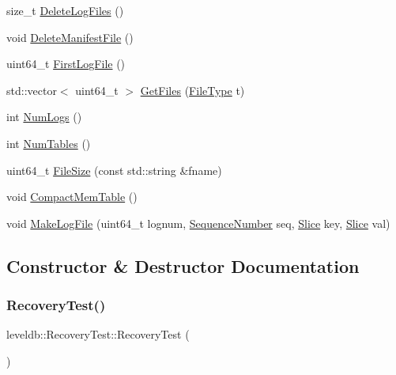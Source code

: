 \begin{DoxyCompactItemize}
\item 
size\+\_\+t \mbox{\hyperlink{classleveldb_1_1_recovery_test_a4c1f0cadf52c5580bf6a68731bb573c0}{Delete\+Log\+Files}} ()
\item 
void \mbox{\hyperlink{classleveldb_1_1_recovery_test_a45284a48b4457b9980ee9425ff6357bc}{Delete\+Manifest\+File}} ()
\item 
uint64\+\_\+t \mbox{\hyperlink{classleveldb_1_1_recovery_test_acc405124d7e1408642f64dadf0eb9227}{First\+Log\+File}} ()
\item 
std\+::vector$<$ uint64\+\_\+t $>$ \mbox{\hyperlink{classleveldb_1_1_recovery_test_a547c06a2c905b46cbb86a793609c28fd}{Get\+Files}} (\mbox{\hyperlink{namespaceleveldb_ab8e559ac5cadcb2b5dd531c60df944f1}{File\+Type}} t)
\item 
int \mbox{\hyperlink{classleveldb_1_1_recovery_test_af02345905fe0db242ae9d68c2536cc4b}{Num\+Logs}} ()
\item 
int \mbox{\hyperlink{classleveldb_1_1_recovery_test_a3113da156897fffafda29b83b1f08baa}{Num\+Tables}} ()
\item 
uint64\+\_\+t \mbox{\hyperlink{classleveldb_1_1_recovery_test_a0e1b5ec063241e273e4c38f7c70a988c}{File\+Size}} (const std\+::string \&fname)
\item 
void \mbox{\hyperlink{classleveldb_1_1_recovery_test_ae356f5bfb63f57c36ce5763c8bf82495}{Compact\+Mem\+Table}} ()
\item 
void \mbox{\hyperlink{classleveldb_1_1_recovery_test_a361c575ee0f6531b95fb58878b1c69bf}{Make\+Log\+File}} (uint64\+\_\+t lognum, \mbox{\hyperlink{namespaceleveldb_a5481ededd221c36d652c371249f869fa}{Sequence\+Number}} seq, \mbox{\hyperlink{classleveldb_1_1_slice}{Slice}} key, \mbox{\hyperlink{classleveldb_1_1_slice}{Slice}} val)
\end{DoxyCompactItemize}


\subsection{Constructor \& Destructor Documentation}
\mbox{\label{classleveldb_1_1_recovery_test_a14ee3aa377807ae74d5b56ed879368c4}} 
\subsubsection{\texorpdfstring{RecoveryTest()}{RecoveryTest()}}
{\footnotesize\ttfamily leveldb\+::\+Recovery\+Test\+::\+Recovery\+Test (\begin{DoxyParamCaption}{ }\end{DoxyParamCaption})\hspace{0.3cm}{\ttfamily [inline]}}

